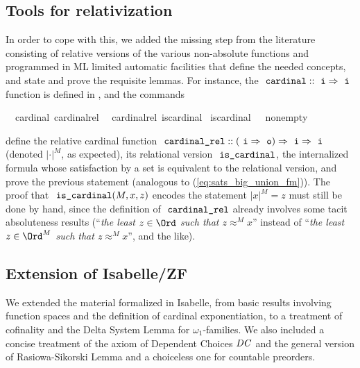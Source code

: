 \subsection{Tools for relativization}
\label{sec:tools-relativization}
In order to cope with this, we added the missing step from the
literature consisting of relative versions of the various non-absolute
functions and programmed in ML limited automatic facilities that
define the needed concepts, and  state and
prove the requisite lemmas. For instance, the 
$\isatt{cardinal}::\tyi \fun \tyi$ function is defined in
, and the commands
\begin{isabelle}
  \isamarkupfalse%
  \ \ {\isachardoublequoteopen}cardinal{\isachardoublequoteclose}\ {\isachardoublequoteopen}cardinal{\isacharunderscore}{\kern0pt}rel{\isachardoublequoteclose}\ \isanewline
  \isamarkupfalse%
  \ {\isachardoublequoteopen}cardinal{\isacharunderscore}{\kern0pt}rel{\isachardoublequoteclose}\ {\isachardoublequoteopen}is{\isacharunderscore}{\kern0pt}cardinal{\isachardoublequoteclose}\isanewline
  \isamarkupfalse%
  \ {\isachardoublequoteopen}is{\isacharunderscore}{\kern0pt}cardinal{\isachardoublequoteclose}\ \ \ {\isachardoublequoteopen}nonempty{\isachardoublequoteclose}%
\end{isabelle}
define the relative cardinal function
$\isatt{cardinal{\uscore}rel}::(\tyi \fun \tyo) \fun \tyi \fun\tyi$
(denoted  $|\cdot|^M$, as expected),
its relational version $\isatt{is{\uscore}cardinal}$, the
internalized formula  whose
satisfaction by a set is equivalent to the relational version, and
prove the previous statement (analogous to (\ref{eq:sats_big_union_fm})).
The proof that $\isatt{is{\uscore}cardinal}(M,x,z)$  encodes the
statement $|x|^M = z$ must still be done by hand, since the definition
of $\isatt{cardinal{\uscore}rel}$ already involves some tacit
absoluteness results (“\textit{the least $z \in \Ord$ such that $z
  \approx^M x$}” instead
of “\textit{the least $z \in \Ord^M$ such that $z
  \approx^M x$}”, and the like).

\subsection{Extension of Isabelle/ZF}
\label{sec:extension-isabellezf}
We extended \cite{Delta_System_Lemma-AFP} the material formalized in
Isabelle, from basic results involving function spaces and the
definition of cardinal exponentiation, to a treatment of cofinality
and the Delta System Lemma for $\omega_1$-families. We also included a
concise treatment of the axiom of Dependent Choices $\mathit{DC}$ and the
general version of Rasiowa-Sikorski Lemma \cite{2018arXiv180705174G}
and a choiceless one for countable preorders.

